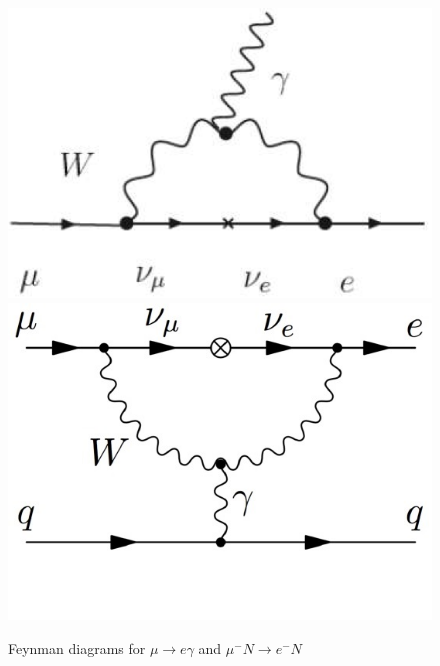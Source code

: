 \documentclass[12pt,a4paper,openright, oneside, titlepage]{book} %
\begin{document}
\begin{figure}[h!]
\includegraphics[scale=0.7]{feynman_mu-egamma}
\includegraphics[scale=0.7]{feynman_mu2e}
\caption{Feynman diagrams for $\mu\rightarrow e\gamma$ and $\mu^-N \rightarrow e^-N$}
\label{_feynman_SM}
\end{figure}
\end{document}
